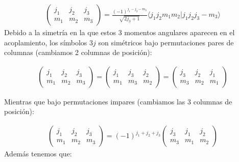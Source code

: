 \begin{eqnarray} \begin{pmatrix}
		j_1 & j_2 & j_3 \\ m_1 & m_2 & m_3
	\end{pmatrix} = \frac{(-1)^{j_1-j_2-m_3}}{\sqrt{2j_3+1}} \langle j_1 j_2 m_1 m_2 |j_1 j_2 j_3 - m_3 \rangle
\end{eqnarray}
Debido a la simetría en la que estos 3 momentos angulares aparecen en el acoplamiento, los símbolos $3j$ son simétricos bajo permutaciones pares de columnas (cambiamos 2 columnas de posición):

\begin{eqnarray} \begin{pmatrix}
		j_1 & j_2 & j_3 \\ m_1 & m_2 & m_3
	\end{pmatrix} =  \begin{pmatrix}
	j_1 & j_3 & j_2\\ m_1 & m_3 & m_2
	\end{pmatrix} =  \begin{pmatrix}
	j_3 & j_2 & j_1 \\ m_3 & m_2 & m_1
		\end{pmatrix}
\end{eqnarray}

Mientras que bajo permutaciones impares (cambiamos las 3 columnas de posición):

\begin{eqnarray} \begin{pmatrix}
		j_1 & j_2 & j_3 \\ m_1 & m_2 & m_3
	\end{pmatrix} = (-1)^{j_1+j_2+j_3} \begin{pmatrix}
	j_3 & j_1 & j_2\\ m_3 & m_1 & m_2
	\end{pmatrix}
\end{eqnarray}
Además tenemos que:

